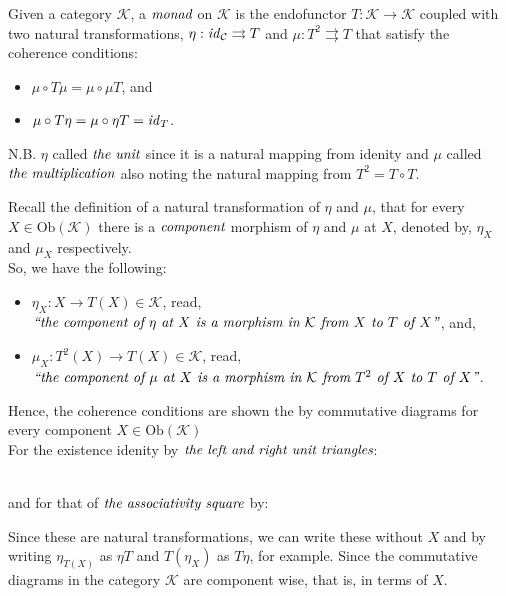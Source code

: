 \documentclass[10pt, oneside, reqno]{amsart}
\begin{document}
\begin{defn}[Monad]
 Given a category $\mathcal{K}$, a $\emph{monad}$ on $\mathcal{K}$ is the endofunctor $T: \mathcal{K} \to \mathcal{K}$
 coupled with two natural transformations, $\eta: \mathit{id}_{\mathcal{C}} \rightrightarrows T$ and $\mu: T^2 \rightrightarrows T$
 that satisfy the coherence conditions:
 \begin{itemize}
  \item $\mu \circ T \mu = \mu \circ \mu T$, and
  \item $\mu \circ T \eta = \mu \circ \eta T = \mathit{id}_{T}$.
 \end{itemize}
\end{defn}
\begin{rem}
 N.B. $\eta$ called $\emph{the unit}$ since it is a natural mapping from idenity and
 $\mu$ called $\emph{the multiplication}$ also noting the natural mapping from $T^2 = T \circ T$.
\end{rem}

Recall the definition of a natural transformation of $\eta$ and $\mu$, that for every $X \in \text{Ob}(\mathcal{K})$
there is a $\emph{component}$ morphism of $\eta$ and $\mu$ at $X$, denoted by, $\eta_{X}$ and $\mu_{X}$ respectively.
\\
So, we have the following:
\begin{itemize}
 \item $\eta_{X}: X \to T(X) \in \mathcal{K}$,
 read, $\emph{``the component of $\eta$ at $X$ is a morphism in $\mathcal{K}$ from $X$ to $T$ of $X$''}$, and,
 \item $\mu_{X}: T^2(X) \to T(X) \in \mathcal{K}$,
 read, $\emph{``the component of $\mu$ at $X$ is a morphism in $\mathcal{K}$ from $T^2$ of $X$ to $T$ of $X$''}$.
\end{itemize}

Hence, the coherence conditions are shown the by commutative diagrams for every component $X \in \text{Ob}(\mathcal{K})$
\\
For the existence idenity by $\emph{the left and right unit triangles}$:
\\
and for that of $\emph{the associativity square}$ by:
Since these are natural transformations,
we can write these without $X$ and by writing $\eta_{T(X)}$ as $\eta T$ and $T(\eta_{X})$ as $T \eta$, for example.
Since the commutative diagrams in the category $\mathcal{K}$ are component wise, that is, in terms of $X$.
\end{document}
